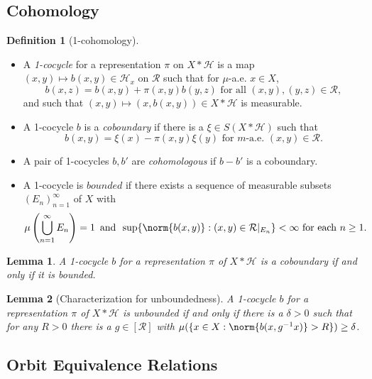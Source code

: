 \documentclass[12pt,letterpaper]{article}
\newcommand{\lr}[1]{\left(#1\right)}
\renewcommand{\H}{\mathcal{H}}
\theoremstyle{definition}
\newtheorem{definition}{Definition}[]
\theoremstyle{plain}
\newtheorem{lemma}{Lemma}[]
\theoremstyle{remark}
\begin{document}
\subsection{Cohomology}

\begin{definition}[1-cohomology]\ \\
    \begin{itemize}
        \item A \textit{1-cocycle} for a representation $ \pi $ on $ X\ast\H $ is a map $ (x,y)\mapsto b(x,y)\in \H_{x} $ on $ \mathcal{R} $ such that for $ \mu $-a.e. $ x\in X $,
        \[
            b(x,z) = b(x,y) + \pi(x,y)b(y,z) \text{ for all } (x,y), (y,z) \in \mathcal{R},
        \]
        and such that $ (x,y)\mapsto(x,b(x,y))\in X\ast\H $ is measurable.
        \item A 1-cocycle $ b $ is a \textit{coboundary} if there is a $ \xi\in S(X\ast\H) $ such that 
        \[
            b(x,y) = \xi(x)-\pi(x,y) \xi(y) \text{ for }  m\text{-a.e. } (x,y)\in \mathcal{R}.
        \]
        \item A pair of 1-cocycles $ b,b ' $ are \textit{cohomologous} if $ b-b ' $ is a coboundary.
        \item A 1-cocycle is $ bounded $ if there exists a sequence of measurable subsets $ (E_{n})_{n=1}^{\infty} $ of $ X $ with 
        \[
            \mu\lr{\bigcup_{n=1}^{\infty}E_{n}} = 1\,\,\,\text{and}\,\,\, \sup\{\norm{b(x,y)}: (x,y)\in \mathcal{R}\vert_{E_{n}}\} < \infty \text{ for each } n\geq 1.
        \]
    \end{itemize}
\end{definition}


\begin{lemma}
    A 1-cocycle $ b $ for a representation $ \pi $ of $ X\ast\H $ is a coboundary if and only if it is bounded.
\end{lemma}

\begin{lemma}[Characterization for unboundedness]
    A 1-cocycle $ b $ for a representation $ \pi $ of $ X\ast\H $ is unbounded if and only if there is a $ \delta>0 $  such that for any $ R>0 $ there is a $ g\in[\mathcal{R}] $ with $ \mu(\{x\in X: \norm{ b(x,g^{-1}x)}>R\}) \geq \delta $.
\end{lemma}

\subsection{Orbit Equivalence Relations}
\end{document}
